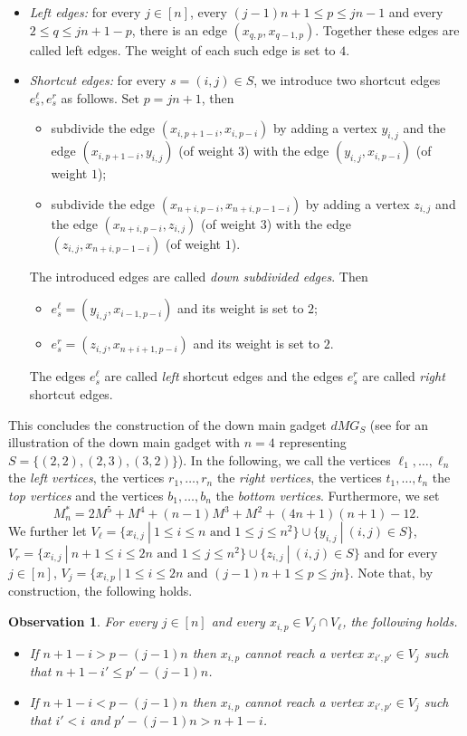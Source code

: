 \documentclass[a4paper,11pt]{article}
\theoremstyle{plain}
\newtheorem{observation}[theorem]{Observation}
\newtheorem{identification rule}{Identification Rule}
\theoremstyle{definition}
\theoremstyle{remark}
\begin{document}
\begin{itemize}
\item \emph{Left edges:} for every $j \in [n]$, every $(j-1)n+1 \leq p \leq jn-1$ and every $2 \leq q \leq jn+1-p$, there is an edge $(x_{q,p},x_{q-1,p})$. Together these edges are called left edges. The weight of each such edge is set to $4$.
\item \emph{Shortcut edges:} for every $s=(i,j) \in S$, we introduce two shortcut edges $e^\ell_s,e^r_s$ as follows. Set $p = jn+1$, then
\begin{itemize}
\item subdivide the edge $(x_{i,p+1-i},x_{i,p-i})$ by adding a vertex $y_{i,j}$ and the edge $(x_{i,p+1-i},y_{i,j})$ (of weight $3$) with the edge $(y_{i,j},x_{i,p-i})$ (of weight $1$);
\item subdivide the edge $(x_{n+i,p-i},x_{n+i,p-1-i})$ by adding a vertex $z_{i,j}$ and the edge $(x_{n+i,p-i},\allowbreak
z_{i,j})$ (of weight $3$) with the edge $(z_{i,j},x_{n+i,p-1-i})$ (of weight $1$). 
\end{itemize}
The introduced edges are called \emph{down subdivided edges}. Then
\begin{itemize}
\item $e^\ell_s= (y_{i,j},x_{i-1,p-i})$ and its weight is set to $2$;
\item $e^r_s = (z_{i,j},x_{n+i+1,p-i})$ and its weight is set to $2$.
\end{itemize}
The edges $e^\ell_s$ are called \emph{left} shortcut edges and the edges $e^r_s$ are called \emph{right} shortcut edges.  
\end{itemize}
This concludes the construction of the down main gadget $dMG_S$ (see  for an illustration of the down main gadget with $n=4$ representing $S= \{(2,2),(2,3),(3,2)\}$). In the following, we call the vertices $\ell_1,\ldots,\ell_n$ the \emph{left vertices}, the vertices $r_1,\ldots,r_n$ the \emph{right vertices}, the vertices $t_1,\ldots,t_n$ the \emph{top vertices} and the vertices $b_1,\ldots,b_n$ the \emph{bottom vertices}. Furthermore, we set
\[
M_n^* = 2M^5 + M^4 + (n-1)M^3 + M^2 + (4n+1)(n+1) - 12.
\] 
We further let $V_\ell = \{x_{i,j}~|~1 \leq i \leq n \text{ and } 1 \leq j \leq n^2\} \cup \{y_{i,j}~|~(i,j) \in S\}$, $V_r = \{x_{i,j}~|~n+1 \leq i \leq 2n \text{ and } 1 \leq j \leq n^2\} \cup \{z_{i,j}~|~(i,j) \in S\}$ and for every $j \in [n]$, $V_j = \{x_{i,p}~|~1 \leq i \leq 2n \text{ and } (j-1)n + 1 \leq p \leq jn\}$. Note that, by construction, the following holds.

\begin{observation}
\label{obs:reach}
For every $j \in [n]$ and every $x_{i,p} \in V_j \cap V_\ell$, the following holds.
\begin{itemize}
\item If $n+1-i > p - (j-1)n$ then $x_{i,p}$ cannot reach a vertex $x_{i',p'} \in V_j$ such that $n+1-i' \leq p' - (j-1)n$.
\item If $n+1-i < p - (j-1)n$ then $x_{i,p}$ cannot reach a vertex $x_{i',p'} \in V_j$ such that $i' < i$ and $p' - (j-1)n > n+1-i$.
\end{itemize}
\end{observation}
\end{document}
